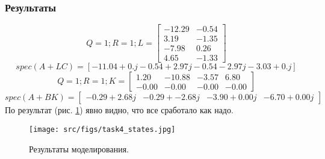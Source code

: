 \subsubsection{Результаты}
\[Q = 1; R = 1; L = \begin{bmatrix}
  -12.29 & -0.54\\
   3.19 & -1.35\\
  -7.98 &  0.26\\
   4.65 & -1.33
 \end{bmatrix}\]
 \[spec(A+LC) = [-11.04+0.j    -0.54+2.97j  -0.54-2.97j  -3.03+0.j  ]\]
 \[Q = 1; R = 1; K= \begin{bmatrix}
   1.20 & -10.88 & -3.57 &  6.80\\
   -0.00 &  -0.00 &  -0.00 &  -0.00
 \end{bmatrix}\]
 \[spec(A + BK) = \begin{bmatrix}
  -0.29 + 2.68j & -0.29 + -2.68j & -3.90 + 0.00j & -6.70 + 0.00j
 \end{bmatrix}\]
По результат (рис. \ref{fig:task4}) явно видно, что все сработало как надо.

\begin{figure}[ht!]
    \centering
    \texttt{[image: src/figs/task4\_states.jpg]}
    \caption{Результаты моделирования.}
    \label{fig:task4}
\end{figure}




\FloatBarrier

